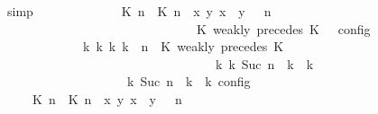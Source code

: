 \begin{isabellebody}
\ simp\isanewline
\ \ \ \ \ \ \isamarkupfalse%
\ \isamarkupfalse%
\ {\isacartoucheopen}{\isasymrho}\ {\isasymin}\ {\isasymlbrakk}\ {\isacharparenleft}{\isacharparenleft}{\isasymlceil}{\isacharhash}\isactrlsup {\isasymle}\ K\ n{\isacharcomma}\ {\isacharhash}\isactrlsup {\isasymle}\ K\ n{\isasymrceil}\ {\isasymin}\ {\isacharparenleft}{\isasymlambda}{\isacharparenleft}x{\isacharcomma}\ y{\isacharparenright}{\isachardot}\ x\ {\isasymle}\ y{\isacharparenright}{\isacharparenright}\ {\isacharhash}\ {\isasymGamma}{\isacharparenright}{\isacharcomma}\ n\isanewline
\ \ \ \ \ \ \ \ \ \ \ \ \ \ \ \ \ \ \ \ \ \ \ \ \ \ \ \ {\isasymturnstile}\ {\isasymPsi}\ {\isasymtriangleright}\ {\isacharparenleft}{\isacharparenleft}K\ weakly\ precedes\ K\ {\isacharhash}\ {\isasymPhi}{\isacharparenright}\ {\isasymrbrakk}\isactrlsub c\isactrlsub o\isactrlsub n\isactrlsub f\isactrlsub i\isactrlsub g\isanewline
\ \ \ \ \ \ \ \ \ \ \ \ {\isasymLongrightarrow}\ {\isacharparenleft}{\isasymexists}{\isasymGamma}\isactrlsub k\ {\isasymPsi}\isactrlsub k\ {\isasymPhi}\isactrlsub k\ k{\isachardot}\ {\isacharparenleft}{\isacharparenleft}{\isasymGamma}{\isacharcomma}\ n\ {\isasymturnstile}\ {\isacharparenleft}{\isacharparenleft}K\ weakly\ precedes\ K\ {\isacharhash}\ {\isasymPsi}{\isacharparenright}\ {\isasymtriangleright}\ {\isasymPhi}{\isacharparenright}\isanewline
\ \ \ \ \ \ \ \ \ \ \ \ \ \ \ \ \ \ \ \ \ \ \ \ \ \ \ \ \ \ \ \ \ \ {\isasymhookrightarrow}\isactrlbsup k\isactrlesup \ {\isacharparenleft}{\isasymGamma}\isactrlsub k{\isacharcomma}\ Suc\ n\ {\isasymturnstile}\ {\isasymPsi}\isactrlsub k\ {\isasymtriangleright}\ {\isasymPhi}\isactrlsub k{\isacharparenright}{\isacharparenright}\isanewline
\ \ \ \ \ \ \ \ \ \ \ \ \ \ \ \ {\isasymand}\ {\isacharparenleft}{\isasymrho}\ {\isasymin}\ {\isasymlbrakk}\ {\isasymGamma}\isactrlsub k{\isacharcomma}\ Suc\ n\ {\isasymturnstile}\ {\isasymPsi}\isactrlsub k\ {\isasymtriangleright}\ {\isasymPhi}\isactrlsub k\ {\isasymrbrakk}\isactrlsub c\isactrlsub o\isactrlsub n\isactrlsub f\isactrlsub i\isactrlsub g{\isacharparenright}{\isacharparenright}{\isacartoucheclose}\isanewline
\ \ \ \ \ \ \isamarkupfalse%
\ {\isacharminus}\isanewline
\ \ \ \ \ \ \ \ \isamarkupfalse%
\ {\isacartoucheopen}{\isasymrho}\ {\isasymin}\ {\isasymlbrakk}\ {\isacharparenleft}{\isacharparenleft}{\isasymlceil}{\isacharhash}\isactrlsup {\isasymle}\ K\ n{\isacharcomma}\ {\isacharhash}\isactrlsup {\isasymle}\ K\ n{\isasymrceil}\ {\isasymin}\ {\isacharparenleft}{\isasymlambda}{\isacharparenleft}x{\isacharcomma}\ y{\isacharparenright}{\isachardot}\ x\ {\isasymle}\ y{\isacharparenright}{\isacharparenright}\ {\isacharhash}\ {\isasymGamma}{\isacharparenright}{\isacharcomma}\ n\isanewline

\end{isabellebody}
